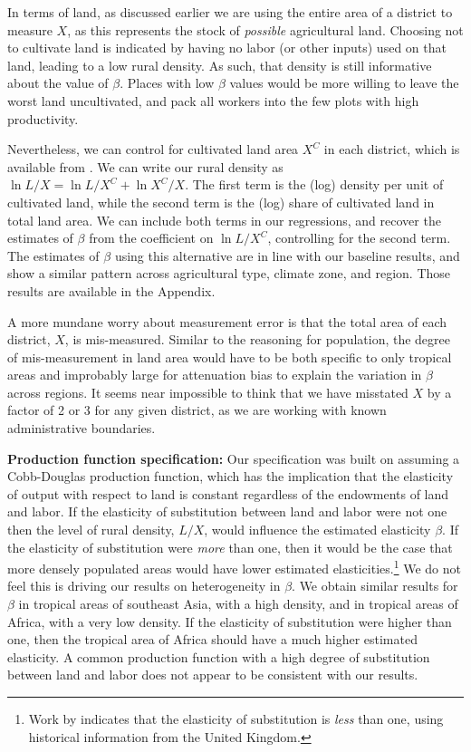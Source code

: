 \documentclass[11pt]{article}
\begin{document}
In terms of land, as discussed earlier we are using the entire area of a district to measure $X$, as this represents the stock of \textit{possible} agricultural land. Choosing not to cultivate land is indicated by having no labor (or other inputs) used on that land, leading to a low rural density. As such, that density is still informative about the value of $\beta$. Places with low $\beta$ values would be more willing to leave the worst land uncultivated, and pack all workers into the few plots with high productivity. 

Nevertheless, we can control for cultivated land area $X^C$ in each district, which is available from \cite{gaez}. We can write our rural density as $\ln L/X = \ln L/X^C + \ln X^C/X$. The first term is the (log) density per unit of cultivated land, while the second term is the (log) share of cultivated land in total land area. We can include both terms in our regressions, and recover the estimates of $\beta$ from the coefficient on $\ln L/X^C$, controlling for the second term. The estimates of $\beta$ using this alternative are in line with our baseline results, and show a similar pattern across agricultural type, climate zone, and region. Those results are available in the Appendix.

A more mundane worry about measurement error is that the total area of each district, $X$, is mis-measured. Similar to the reasoning for population, the degree of mis-measurement in land area would have to be both specific to only tropical areas and improbably large for attenuation bias to explain the variation in $\beta$ across regions. It seems near impossible to think that we have misstated $X$ by a factor of 2 or 3 for any given district, as we are working with known administrative boundaries.

\vspace{.5cm}\noindent\textbf{Production function specification:} Our specification was built on assuming a Cobb-Douglas production function, which has the implication that the elasticity of output with respect to land is constant regardless of the endowments of land and labor. If the elasticity of substitution between land and labor were not one then the level of rural density, $L/X$, would influence the estimated elasticity $\beta$. If the elasticity of substitution were \textit{more} than one, then it would be the case that more densely populated areas would have lower estimated elasticities.\footnote{Work by \citet{wilde2012} indicates that the elasticity of substitution is \textit{less} than one, using historical information from the United Kingdom.} We do not feel this is driving our results on heterogeneity in $\beta$. We obtain similar results for $\beta$ in tropical areas of southeast Asia, with a high density, and in tropical areas of Africa, with a very low density. If the elasticity of substitution were higher than one, then the tropical area of Africa should have a much higher estimated elasticity. A common production function with a high degree of substitution between land and labor does not appear to be consistent with our results.
\end{document}

